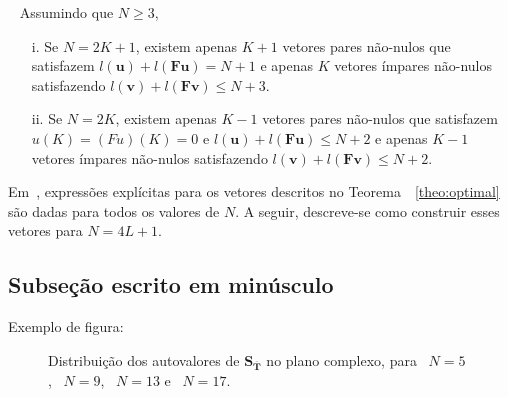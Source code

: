 \begin{theorem}\label{theo:optimal} \cite{Kuznetsov_2015}~
Assumindo que $N\geq 3$,
\vspace{-0.5cm}
\begin{enumerate}
\item[i.] Se $N = 2K +1$, existem apenas $K+1$ vetores pares não-nulos que satisfazem $l(\mathbf{u})+l(\mathbf{Fu}) = N +1$ e apenas $K$ vetores ímpares não-nulos satisfazendo $l(\mathbf{v}) + l(\mathbf{Fv}) \leq N + 3$.
\item[ii.] Se $N = 2K$, existem apenas $K - 1$ vetores pares não-nulos que satisfazem $u(K) = (Fu)(K)= 0$ e
$l(\mathbf{u}) + l(\mathbf{Fu}) \leq N + 2$ e apenas $K - 1$ vetores ímpares  não-nulos satisfazendo $l(\mathbf{v}) + l(\mathbf{Fv}) \leq N + 2$.
\end{enumerate}
\end{theorem}
Em~\cite{Kuznetsov_2015}, expressões explícitas para os vetores descritos no Teorema~~\ref{theo:optimal} são dadas para todos os valores de $N$. A seguir, descreve-se como construir esses vetores para $N=4L+1$.


\subsection{Subseção escrito em minúsculo}\label{sec:pei}

Exemplo de figura:

\begin{figure}[!hpt] 
	\centering	
	\caption[Distribuição dos autovalores de $\mathbf{S}_{\overline{\mathbf{T}}}$ no plano complexo.]{Distribuição dos autovalores de $\mathbf{S}_{\overline{\mathbf{T}}}$ no plano complexo, para~ $N=5$,~ $N=9$,~ $N=13$ e~ $N=17$.}
	\label{fig:eigs}
\hspace{0.05cm}
\hspace{0.05cm}
\hspace{0.05cm}
\end{figure}




